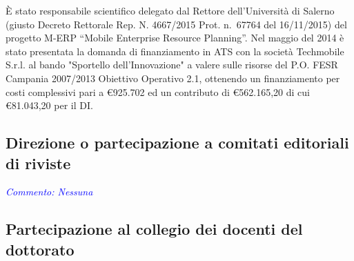 \documentclass[11pt,a4paper,sans]{moderncv}        %
\newcommand{\commento}[1]{{\footnotesize{\emph{\textcolor{blue}{Commento: #1}}}}}
\begin{document}
{
\`E stato responsabile scientifico delegato dal Rettore dell’Università di Salerno (giusto Decreto Rettorale Rep. N. 4667/2015 Prot. n.~67764 del 16/11/2015) del progetto M-ERP “Mobile Enterprise Resource Planning”.
Nel maggio del 2014 è stato presentata la domanda di finanziamento in ATS con la società Techmobile S.r.l. al bando "Sportello dell'Innovazione" a valere sulle risorse del P.O. FESR Campania 2007/2013 Obiettivo Operativo 2.1, ottenendo un finanziamento per costi complessivi pari a \euro{925.702} ed un contributo di \euro{562.165,20} di cui \euro{81.043,20} per il DI.
}


\subsection{Direzione o partecipazione a comitati editoriali di riviste} 


\commento{Nessuna}

\subsection{Partecipazione al collegio dei docenti del dottorato}

\end{document}
